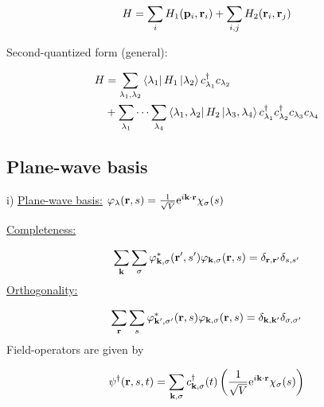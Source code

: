 \begin{equation}
	H= \sum_i H_1(\vb{p}_i, \vb{r}_i) + \sum_{i,j} H_2 (\vb{r}_i, \vb{r}_j )
\end{equation}

\begin{tcolorbox}
	\noindent Second-quantized form (general):
	
	\begin{align}
		H & = \sum_{\lambda_{1}, \lambda_{2}} \bra{\lambda_{1}} H_1 \ket{\lambda_{2}} c^{\dagger}_{\lambda_1} c_{\lambda_2} \nonumber \\
		&+ \sum_{\lambda_{1}} \cdots \sum_{\lambda_{4}} \bra{\lambda_{1}, \lambda_{2}} H_2 \ket{\lambda_{3}, \lambda_{4}} c^{\dagger}_{\lambda_1} c^{\dagger}_{\lambda_2} c_{\lambda_{3}} c_{\lambda_{4}}
	\end{align}
\end{tcolorbox}

\subsection{Plane-wave basis}

\noindent i) \uline{Plane-wave basis:}  ${\varphi_{\lambda} (\vb{r},s) = \frac{1}{\sqrt{V}} \mathrm{e}^{i \vb{k}\cdot \vb{r}} \chi_\sigma (s)  }$ \\
\linebreak

\noindent \uline{Completeness:}

\begin{equation}
	\sum_{\vb{k}} \sum_{\sigma} \varphi_{\vb{k}, \sigma}^* (\vb{r}', s') \varphi_{\vb{k}, \sigma} (\vb{r}, s) = \delta_{\vb{r}, \vb{r}'} \delta_{s,s'}
\end{equation}
\linebreak
\noindent \uline{Orthogonality:}

\begin{equation}
	\sum_{\vb{r}} \sum_{s} \varphi_{\vb{k}', \sigma'}^* (\vb{r}, s) \varphi_{\vb{k}, \sigma} (\vb{r}, s) = \delta_{\vb{k}, \vb{k}'} \delta_{\sigma,\sigma'}
\end{equation}
\linebreak
\noindent Field-operators are given by

\begin{equation}
	\psi^\dagger (\vb{r},s,t) = \sum_{\vb{k}, \sigma} c^{\dagger}_{\vb{k}, \sigma} (t) \left( \frac{1}{\sqrt{V}} \mathrm{e}^{i \vb{k} \cdot \vb{r}} \chi_\sigma (s) \right)
\end{equation}

